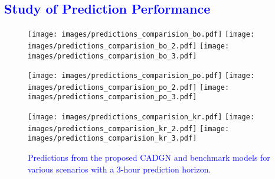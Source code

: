 \documentclass[lettersize,journal]{IEEEtran}
\newcommand{\hl}[1]{\textcolor{blue}{#1}}
\begin{document}
\vspace{-8pt}
\subsection{\hl{Study of Prediction Performance}}

\begin{figure*}[t!]
	\centering
	\texttt{[image: images/predictions\_comparision\_bo.pdf]}
	\texttt{[image: images/predictions\_comparision\_bo\_2.pdf]}
	\texttt{[image: images/predictions\_comparision\_bo\_3.pdf]}

	\texttt{[image: images/predictions\_comparision\_po.pdf]}
	\texttt{[image: images/predictions\_comparision\_po\_2.pdf]}
	\texttt{[image: images/predictions\_comparision\_po\_3.pdf]}

	\texttt{[image: images/predictions\_comparision\_kr.pdf]}
	\texttt{[image: images/predictions\_comparision\_kr\_2.pdf]}
	\texttt{[image: images/predictions\_comparision\_kr\_3.pdf]}

	\caption{\hl{Predictions from the proposed CADGN and benchmark models for various scenarios with a 3-hour prediction horizon.}}
        \vspace{-18pt}
	\label{figure:prediction_performance}
\end{figure*}

\end{document}
